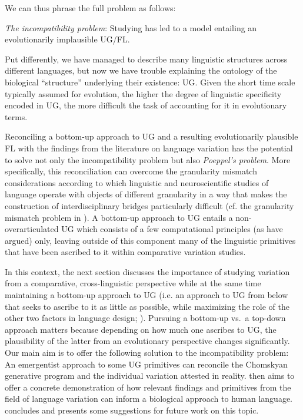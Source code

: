 \documentclass[output=paper]{langsci/langscibook}
\begin{document}
We can thus phrase the full problem as follows:

\ea \emph{The incompatibility problem}:
Studying  has led to a model entailing an evolutionarily
    implausible \gls{UG}/\gls{FL}.
\z

Put differently, we have managed to describe many linguistic structures across
different languages, but now we have trouble explaining the ontology of the
biological \enquote{structure} underlying their existence: \gls{UG}.  Given the short
time scale typically assumed for evolution, the higher the degree of linguistic
specificity encoded in \gls{UG}, the more difficult the task of accounting for
it in evolutionary terms.

Reconciling a bottom-up approach to \gls{UG} and a resulting evolutionarily
plausible \gls{FL} with the findings from the literature on language variation
has the potential to solve not only the incompatibility problem but also
\emph{Poeppel's problem}. More specifically, this reconciliation can overcome the
granularity mismatch considerations according to which linguistic and
neuroscientific studies of language operate with objects of different
granularity in a way that makes the construction of interdisciplinary bridges
particularly difficult (cf. the granularity mismatch problem in
\citealt{PoeEmb2005}). A bottom-up approach to \gls{UG} entails a
non-overarticulated \gls{UG} which consists of a few computational principles
(as \citealt{DiSciulloEtAl2010} have argued) only, leaving outside of this
component many of the linguistic primitives that have been ascribed to it
within comparative variation studies.

In this context, the next section discusses the importance of studying
variation from a comparative, cross-linguistic perspective while at the same
time maintaining a bottom-up approach to \gls{UG} (i.e. an approach to \gls{UG}
from below that seeks to ascribe to it as little as possible, while maximizing
the role of the other two factors in language design; \citealt{Chomsky2007}).
Pursuing a bottom-up vs.\ a top-down approach matters because depending on how
much one ascribes to \gls{UG}, the plausibility of the latter from an
evolutionary perspective changes significantly. Our main aim is to offer the
following solution to the incompatibility problem: An emergentist approach to
some \gls{UG} primitives can reconcile the Chomskyan generative program and the
individual variation attested in reality.  then aims to
offer a concrete demonstration of how relevant findings and primitives from the
field of language variation can inform a biological approach to human language.
 concludes and presents some suggestions for future work on
this topic.
\end{document}

